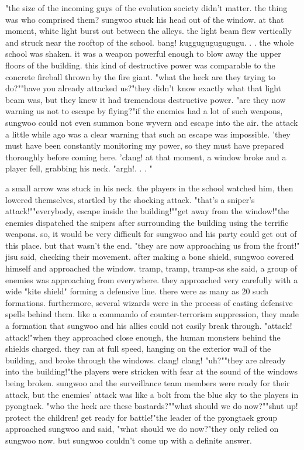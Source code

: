 "the size of the incoming guys of the evolution society didn't matter.
 the thing was who comprised them? sungwoo stuck his head out of the window.
 at that moment, white light burst out between the alleys.
the light beam flew vertically and struck near the rooftop of the school.
bang! kuggugugugugugu.
.
.
the whole school was shaken.
 it was a weapon powerful enough to blow away the upper floors of the building.
 this kind of destructive power was comparable to the concrete fireball thrown by the fire giant.
 "what the heck are they trying to do?""have you already attacked us?"they didn't know exactly what that light beam was, but they knew it had tremendous destructive power.
"are they now warning us not to escape by flying?"if the enemies had a lot of such weapons, sungwoo could not even summon bone wyvern and escape into the air.
 the attack a little while ago was a clear warning that such an escape was impossible.
 'they must have been constantly monitoring my power, so they must have prepared thoroughly before coming here.
'clang! at that moment, a window broke and a player fell, grabbing his neck.
 "argh!.
.
.
"

a small arrow was stuck in his neck.
 the players in the school watched him, then lowered themselves, startled by the shocking attack.
"that's a sniper's attack!""everybody, escape inside the building!""get away from the window!"the enemies dispatched the snipers after surrounding the building using the terrific weapons.
 so, it would be very difficult for sungwoo and his party could get out of this place.
but that wasn't the end.
"they are now approaching us from the front!" jisu said, checking their movement.
after making a bone shield, sungwoo covered himself and approached the window.
tramp, tramp, tramp-as she said, a group of enemies was approaching from everywhere.
 they approached very carefully with a wide "kite shield" forming a defensive line.
 there were as many as 20 such formations.
 furthermore, several wizards were in the process of casting defensive spells behind them.
 like a commando of counter-terrorism suppression, they made a formation that sungwoo and his allies could not easily break through.
 "attack! attack!"when they approached close enough, the human monsters behind the shields charged.
 they ran at full speed, hanging on the exterior wall of the building, and broke through the windows.
clang! clang! "uh?""they are already into the building!"the players were stricken with fear at the sound of the windows being broken.
 sungwoo and the surveillance team members were ready for their attack, but the enemies' attack was like a bolt from the blue sky to the players in pyongtaek.
 "who the heck are these bastards?""what should we do now?""shut up! protect the children! get ready for battle!"the leader of the pyongtaek group approached sungwoo and said, "what should we do now?"they only relied on sungwoo now.
 but sungwoo couldn't come up with a definite answer.


 